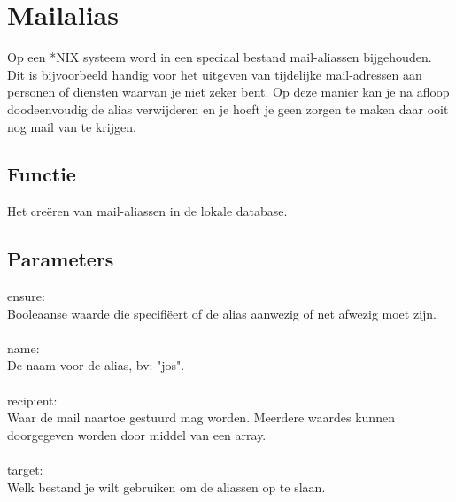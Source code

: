 \section{Mailalias}
Op een *NIX systeem word in een speciaal bestand mail-aliassen bijgehouden. Dit is bijvoorbeeld handig voor het uitgeven van tijdelijke mail-adressen aan personen of diensten waarvan je niet zeker bent. Op deze manier kan je na afloop doodeenvoudig de alias verwijderen en je hoeft je geen zorgen te maken daar ooit nog mail van te krijgen.

\subsection{Functie}
Het cre\"{e}ren van mail-aliassen in de lokale database.

\subsection{Parameters}
ensure:\\
Booleaanse waarde die specifi\"{e}ert of de alias aanwezig of net afwezig moet zijn.\\\\
%
name:\\
De naam voor de alias, bv: "jos".\\\\
%
recipient:\\
Waar de mail naartoe gestuurd mag worden. Meerdere waardes kunnen doorgegeven worden door middel van een array.\\\\
%
target:\\
Welk bestand je wilt gebruiken om de aliassen op te slaan.\\\\
